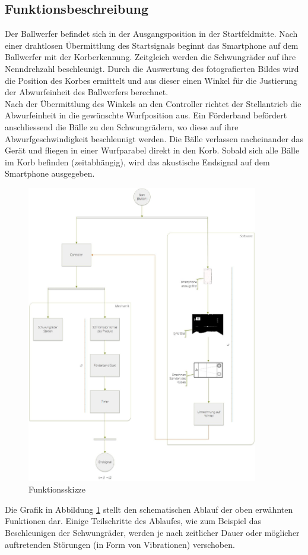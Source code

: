 \subsection{Funktionsbeschreibung}
Der Ballwerfer befindet sich in der Ausgangsposition in der Startfeldmitte. 
Nach einer drahtlosen Übermittlung des Startsignals beginnt das Smartphone auf 
dem Ballwerfer mit der Korberkennung. Zeitgleich werden die Schwungräder auf ihre Nenndrehzahl beschleunigt.
Durch die Auswertung des fotografierten Bildes wird die Position des Korbes ermittelt und aus dieser einen 
Winkel für die Justierung der Abwurfeinheit des Ballwerfers berechnet.\\
Nach der Übermittlung des Winkels an den Controller richtet der Stellantrieb die Abwurfeinheit in die gewünschte Wurfposition aus. 
Ein Förderband befördert anschliessend die Bälle zu den Schwungrädern, wo diese auf ihre Abwurfgeschwindigkeit beschleunigt werden. 
Die Bälle verlassen nacheinander das Gerät und fliegen in einer Wurfparabel direkt in den Korb. Sobald sich alle Bälle im Korb befinden (zeitabhängig),
wird das akustische Endsignal auf dem Smartphone ausgegeben.\\
\newpage

\begin{figure}[h!]
	\centering
	\includegraphics[width=0.9\textwidth]{Enddokumentation/Loesungskonzept/Bilder/FlowOnChart_v2.jpg}
	\caption{Funktionsskizze}
	\label{fig:FlowChart}
\end{figure}
Die Grafik in Abbildung \ref{fig:FlowChart} stellt den schematischen Ablauf der oben erwähnten Funktionen dar. 
Einige Teilschritte des Ablaufes, wie zum Beispiel das Beschleunigen der Schwungräder, werden 
je nach zeitlicher Dauer oder möglicher auftretenden Störungen (in Form von Vibrationen) verschoben.